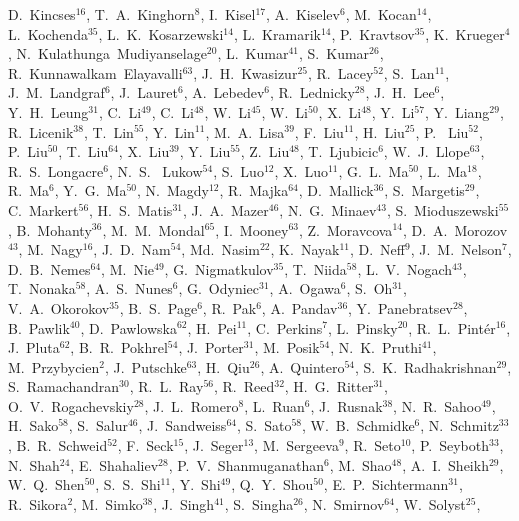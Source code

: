 {D.~Kincses$^{16}$,
T.~A.~Kinghorn$^{8}$,
I.~Kisel$^{17}$,
A.~Kiselev$^{6}$,
M.~Kocan$^{14}$,
L.~Kochenda$^{35}$,
L.~K.~Kosarzewski$^{14}$,
L.~Kramarik$^{14}$,
P.~Kravtsov$^{35}$,
K.~Krueger$^{4}$,
N.~Kulathunga~Mudiyanselage$^{20}$,
L.~Kumar$^{41}$,
S.~Kumar$^{26}$,
R.~Kunnawalkam~Elayavalli$^{63}$,
J.~H.~Kwasizur$^{25}$,
R.~Lacey$^{52}$,
S.~Lan$^{11}$,
J.~M.~Landgraf$^{6}$,
J.~Lauret$^{6}$,
A.~Lebedev$^{6}$,
R.~Lednicky$^{28}$,
J.~H.~Lee$^{6}$,
Y.~H.~Leung$^{31}$,
C.~Li$^{49}$,
C.~Li$^{48}$,
W.~Li$^{45}$,
W.~Li$^{50}$,
X.~Li$^{48}$,
Y.~Li$^{57}$,
Y.~Liang$^{29}$,
R.~Licenik$^{38}$,
T.~Lin$^{55}$,
Y.~Lin$^{11}$,
M.~A.~Lisa$^{39}$,
F.~Liu$^{11}$,
H.~Liu$^{25}$,
P.~ Liu$^{52}$,
P.~Liu$^{50}$,
T.~Liu$^{64}$,
X.~Liu$^{39}$,
Y.~Liu$^{55}$,
Z.~Liu$^{48}$,
T.~Ljubicic$^{6}$,
W.~J.~Llope$^{63}$,
R.~S.~Longacre$^{6}$,
N.~S.~ Lukow$^{54}$,
S.~Luo$^{12}$,
X.~Luo$^{11}$,
G.~L.~Ma$^{50}$,
L.~Ma$^{18}$,
R.~Ma$^{6}$,
Y.~G.~Ma$^{50}$,
N.~Magdy$^{12}$,
R.~Majka$^{64}$,
D.~Mallick$^{36}$,
S.~Margetis$^{29}$,
C.~Markert$^{56}$,
H.~S.~Matis$^{31}$,
J.~A.~Mazer$^{46}$,
N.~G.~Minaev$^{43}$,
S.~Mioduszewski$^{55}$,
B.~Mohanty$^{36}$,
M.~M.~Mondal$^{65}$,
I.~Mooney$^{63}$,
Z.~Moravcova$^{14}$,
D.~A.~Morozov$^{43}$,
M.~Nagy$^{16}$,
J.~D.~Nam$^{54}$,
Md.~Nasim$^{22}$,
K.~Nayak$^{11}$,
D.~Neff$^{9}$,
J.~M.~Nelson$^{7}$,
D.~B.~Nemes$^{64}$,
M.~Nie$^{49}$,
G.~Nigmatkulov$^{35}$,
T.~Niida$^{58}$,
L.~V.~Nogach$^{43}$,
T.~Nonaka$^{58}$,
A.~S.~Nunes$^{6}$,
G.~Odyniec$^{31}$,
A.~Ogawa$^{6}$,
S.~Oh$^{31}$,
V.~A.~Okorokov$^{35}$,
B.~S.~Page$^{6}$,
R.~Pak$^{6}$,
A.~Pandav$^{36}$,
Y.~Panebratsev$^{28}$,
B.~Pawlik$^{40}$,
D.~Pawlowska$^{62}$,
H.~Pei$^{11}$,
C.~Perkins$^{7}$,
L.~Pinsky$^{20}$,
R.~L.~Pint\'{e}r$^{16}$,
J.~Pluta$^{62}$,
B.~R.~Pokhrel$^{54}$,
J.~Porter$^{31}$,
M.~Posik$^{54}$,
N.~K.~Pruthi$^{41}$,
M.~Przybycien$^{2}$,
J.~Putschke$^{63}$,
H.~Qiu$^{26}$,
A.~Quintero$^{54}$,
S.~K.~Radhakrishnan$^{29}$,
S.~Ramachandran$^{30}$,
R.~L.~Ray$^{56}$,
R.~Reed$^{32}$,
H.~G.~Ritter$^{31}$,
O.~V.~Rogachevskiy$^{28}$,
J.~L.~Romero$^{8}$,
L.~Ruan$^{6}$,
J.~Rusnak$^{38}$,
N.~R.~Sahoo$^{49}$,
H.~Sako$^{58}$,
S.~Salur$^{46}$,
J.~Sandweiss$^{64}$,
S.~Sato$^{58}$,
W.~B.~Schmidke$^{6}$,
N.~Schmitz$^{33}$,
B.~R.~Schweid$^{52}$,
F.~Seck$^{15}$,
J.~Seger$^{13}$,
M.~Sergeeva$^{9}$,
R.~Seto$^{10}$,
P.~Seyboth$^{33}$,
N.~Shah$^{24}$,
E.~Shahaliev$^{28}$,
P.~V.~Shanmuganathan$^{6}$,
M.~Shao$^{48}$,
A.~I.~Sheikh$^{29}$,
W.~Q.~Shen$^{50}$,
S.~S.~Shi$^{11}$,
Y.~Shi$^{49}$,
Q.~Y.~Shou$^{50}$,
E.~P.~Sichtermann$^{31}$,
R.~Sikora$^{2}$,
M.~Simko$^{38}$,
J.~Singh$^{41}$,
S.~Singha$^{26}$,
N.~Smirnov$^{64}$,
W.~Solyst$^{25}$,
}
